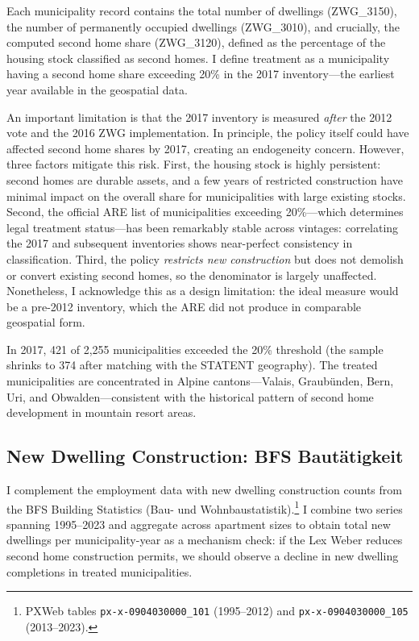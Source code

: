 \documentclass[12pt]{article}
\begin{document}
Each municipality record contains the total number of dwellings (ZWG\_3150), the number of permanently occupied dwellings (ZWG\_3010), and crucially, the computed second home share (ZWG\_3120), defined as the percentage of the housing stock classified as second homes. I define treatment as a municipality having a second home share exceeding 20\% in the 2017 inventory---the earliest year available in the geospatial data.

An important limitation is that the 2017 inventory is measured \textit{after} the 2012 vote and the 2016 ZWG implementation. In principle, the policy itself could have affected second home shares by 2017, creating an endogeneity concern. However, three factors mitigate this risk. First, the housing stock is highly persistent: second homes are durable assets, and a few years of restricted construction have minimal impact on the overall share for municipalities with large existing stocks. Second, the official ARE list of municipalities exceeding 20\%---which determines legal treatment status---has been remarkably stable across vintages: correlating the 2017 and subsequent inventories shows near-perfect consistency in classification. Third, the policy \textit{restricts new construction} but does not demolish or convert existing second homes, so the denominator is largely unaffected. Nonetheless, I acknowledge this as a design limitation: the ideal measure would be a pre-2012 inventory, which the ARE did not produce in comparable geospatial form.

In 2017, 421 of 2,255 municipalities exceeded the 20\% threshold (the sample shrinks to 374 after matching with the STATENT geography). The treated municipalities are concentrated in Alpine cantons---Valais, Graubünden, Bern, Uri, and Obwalden---consistent with the historical pattern of second home development in mountain resort areas.

\subsection{New Dwelling Construction: BFS Bautätigkeit}

I complement the employment data with new dwelling construction counts from the BFS Building Statistics (Bau- und Wohnbaustatistik).\footnote{PXWeb tables \texttt{px-x-0904030000\_101} (1995--2012) and \texttt{px-x-0904030000\_105} (2013--2023).} I combine two series spanning 1995--2023 and aggregate across apartment sizes to obtain total new dwellings per municipality-year as a mechanism check: if the Lex Weber reduces second home construction permits, we should observe a decline in new dwelling completions in treated municipalities.
\end{document}
